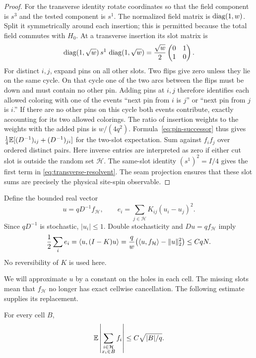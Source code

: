 \begin{proof}
For the transverse identity rotate coordinates so that the field
component is $s^3$ and the tested component is $s^1$.  The normalized
field matrix is $\operatorname{diag}(1,w)$.  Split it symmetrically around each
insertion; this is permitted because the total field commutes with
$H_0$.  At a transverse insertion its slot matrix is
\[
 \operatorname{diag}(1,\sqrt w)\,s^1\,\operatorname{diag}(1,\sqrt w)
   =\frac{\sqrt w}{2}\begin{pmatrix}0&1\\1&0\end{pmatrix}.
\]
For distinct $i,j$, expand pins on all other slots.  Two flips give
zero unless they lie on the same cycle.  On that cycle one of the two
arcs between the flips must be down and must contain no other pin.
Adding pins at $i,j$ therefore identifies each allowed coloring with
one of the events ``next pin from $i$ is $j$'' or ``next pin from
$j$ is $i$.''  If there are no other pins on this cycle both events
contribute, exactly accounting for its two allowed colorings.
The ratio of insertion weights to the weights with the added pins is
$w/(4q^2)$.  Formula~\eqref{eq:pin-successor} thus gives
$\frac14\mathbb E[(D^{-1})_{ij}+(D^{-1})_{ji}]$ for the two-slot
expectation.  Sum against $f_if_j$ over ordered distinct pairs.
Here inverse entries are interpreted as zero if either cut slot is
outside the random set $\mathcal H$.
The same-slot identity $(s^1)^2=I/4$ gives the first term in
\eqref{eq:transverse-resolvent}.  The seam projection ensures that
these slot sums are precisely the physical site-spin observable.
\end{proof}

Define the bounded real vector
\begin{equation}\label{eq:resolvent-u}
 u=qD^{-1}f_{\mathcal H},\qquad
 e_i=\sum_{j\in\mathcal H}K_{ij}(u_i-u_j)^2.
\end{equation}
Since $qD^{-1}$ is stochastic, $|u_i|\le1$.  Double stochasticity
and $Du=qf_{\mathcal H}$ imply
\begin{equation}\label{eq:traversal-energy}
 \frac12\sum_i e_i
 =\langle u,(I-K)u\rangle
 =\frac q w\bigl(\langle u,f_{\mathcal H}\rangle-\lVert u\rVert_2^2\bigr)
 \le CqN.
\end{equation}
No reversibility of $K$ is used here.

We will approximate $u$ by a constant on the holes in each cell.
The missing slots mean that $f_{\mathcal H}$ no longer has exact
cellwise cancellation.  The following estimate supplies its replacement.

\begin{lemma}\label{lem:hole-cancellation}
For every cell $B$,
\begin{equation}\label{eq:hole-cancellation}
 \mathbb E\left|\sum_{\substack{i\in\mathcal H\\x_i\in B}}f_i\right|
 \le C\sqrt{|B|/q}.
\end{equation}
\end{lemma}

